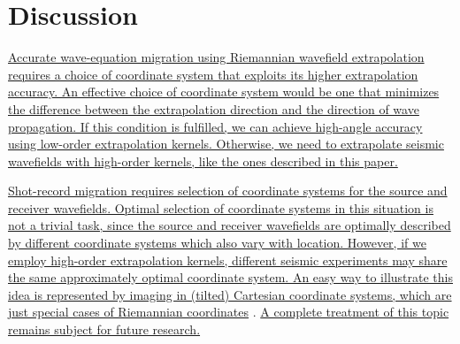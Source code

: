 \section{Discussion}
\uline{ Accurate wave-equation migration using Riemannian wavefield
extrapolation requires a choice of coordinate system that exploits its
higher extrapolation accuracy. An effective choice of coordinate
system would be one that minimizes the difference between the
extrapolation direction and the direction of wave propagation. If this
condition is fulfilled, we can achieve high-angle accuracy using
low-order extrapolation kernels. Otherwise, we need to extrapolate
seismic wavefields with high-order kernels, like the ones described in
this paper.}  \par \uline{ Shot-record migration requires selection of
coordinate systems for the source and receiver wavefields. Optimal
selection of coordinate systems in this situation is not a trivial
task, since the source and receiver wavefields are optimally described
by different coordinate systems which also vary with
location. However, if we employ high-order extrapolation kernels,
different seismic experiments may share the same approximately optimal
coordinate system. An easy way to illustrate this idea is represented
by imaging in (tilted) Cartesian coordinate systems, which are just
special cases of Riemannian coordinates}
\cite[]{SavaFomel.jse.rwesalt}. \uline{A complete treatment of this
topic remains subject for future research.}
